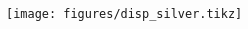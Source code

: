 \documentclass[mathserif,18pt,xcolor=table,c]{beamer}
\begin{document}
\begin{frame}
\begin{columns}[T]
\begin{column}[T]{.5\textwidth}
\begin{figure}
            \texttt{[image: figures/disp\_silver.tikz]}
            \label{fig:disp_silver}
          \end{figure}
      \end{column}
    \end{columns}
  \end{frame}
\end{document}
